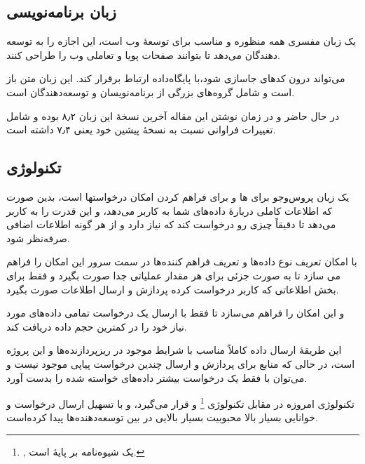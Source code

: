 \subsection{زبان برنامه‌نویسی }\label{subsec1:sec3:chap4}

یک زبان مفسری همه منظوره و مناسب برای توسعهٔ وب است،‌ این اجازه را به توسعه دهندگان می‌دهد تا بتوانند صفحات پویا و تعاملی وب را طراحی کنند.

می‌تواند درون کد‌های  جاسازی شود،‌با پایگاه‌داده ارتباط برقرار کند.
این زبان متن باز است و شامل گروه‌های بزرگی از برنامه‌نویسان و توسعه‌دهندگان است.

در حال حاضر و در زمان نوشتن این مقاله آخرین نسخهٔ این زبان ۸٫۲ بوده و شامل تغییرات فراوانی نسبت به نسخهٔ پیشین خود یعنی ۷٫۴ داشته است.
\cite{PHPDoc:online}

\subsection{تکنولوژی }\label{subsec2:sec3:chap4}

یک زبان پروس‌وجو برای ها و برای فراهم کردن امکان درخواستها است، بدین صورت که اطلاعات کاملی دربارهٔ داده‌های  شما به کاربر می‌دهد، و این قدرت را به کاربر می‌دهد تا دقیقاً چیزی رو درخواست کند که نیاز دارد و از هر گونه اطلاعات اضافی صرفه‌نظر شود.

با امکان تعریف نوع داده‌ها و تعریف فراهم کننده‌ها در سمت سرور این امکان را فراهم می سازد تا به صورت جزئی برای هر مقدار عملیاتی جدا صورت بگیرد و فقط برای بخش اطلاعاتی که کاربر درخواست کرده پردازش و ارسال اطلاعات صورت بگیرد.

و این امکان را فراهم می‌سازد تا فقط با ارسال یک درخواست تمامی داده‌های مورد نیاز خود را در کمترین حجم داده دریافت کند.

این طریقهٔ ارسال داده کاملاً مناسب با شرایط موجود در ریزپردازنده‌ها و این پروژه است، در حالی که منابع برای پردازش و ارسال چندین درخواست پیاپی موجود نیست و می‌توان با فقط یک درخواست بیشتر داده‌های خواسته شده را بدست آورد.

تکنولوژی  امروزه در مقابل تکنولوژی \footnote{, یک شیوه‌نامه بر پایهٔ  است.}
 و  قرار می‌گیرد، و با تسهیل ارسال درخواست و خوانایی بسیار بالا محبوبیت بسیار بالایی در بین توسعه‌دهنده‌ها پیدا کرده‌است.
\cite{GraphQL:online}
